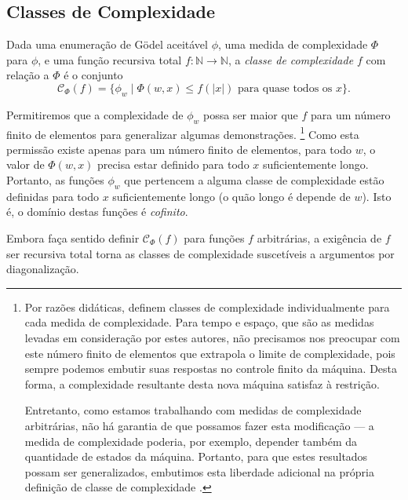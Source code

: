 \subsection{Classes de Complexidade}

\begin{definition}\cite[p.~242]{Kozen2006}
    Dada uma enumeração de Gödel aceitável $\phi$,
    uma medida de complexidade $\Phi$ para $\phi$,
    e uma função recursiva total
    $f: \mathbb N \rightarrow \mathbb N$,
    a \emph{classe de complexidade $f$} com relação a $\Phi$
    é o conjunto
    \begin{equation*}
        \mathcal C_\Phi(f) = \{ \phi_w \mid \Phi(w, x) \leq f(|x|)
            \text{ para quase todos os $x$}
        \}.
    \end{equation*}
\end{definition}
Permitiremos que a complexidade de $\phi_w$
possa ser maior que $f$ para um número finito de elementos
para generalizar algumas demonstrações.%
\footnote{
    Por razões didáticas, 
    definem classes de complexidade individualmente para cada medida de complexidade.
    Para tempo e espaço,
    que são as medidas levadas em consideração por estes autores,
    não precisamos nos preocupar com este número finito de elementos
    que extrapola o limite de complexidade,
    pois sempre podemos embutir suas respostas no controle finito da máquina.
    Desta forma,
    a complexidade resultante desta nova máquina satisfaz à restrição.

    Entretanto, como estamos trabalhando com medidas de complexidade arbitrárias,
    não há garantia de que possamos fazer esta modificação
    --- a medida de complexidade poderia, por exemplo,
    depender também da quantidade de estados da máquina.
    Portanto, para que estes resultados possam ser generalizados,
    embutimos esta liberdade adicional
    na própria definição de classe de complexidade
    \cite[p.~80]{McCreightMeyer1969}.
}
Como esta permissão existe apenas para um número finito de elementos,
para todo $w$, o valor de $\Phi(w, x)$ precisa estar definido
para todo $x$ suficientemente longo.
Portanto,
as funções $\phi_w$ que pertencem a alguma classe de complexidade
estão definidas para todo $x$ suficientemente longo
(o quão longo é depende de $w$).
Isto é, o domínio destas funções é \emph{cofinito}.

Embora faça sentido definir $\mathcal C_\Phi(f)$
para funções $f$ arbitrárias,
a exigência de $f$ ser recursiva total
torna as classes de complexidade
suscetíveis a argumentos por diagonalização.

